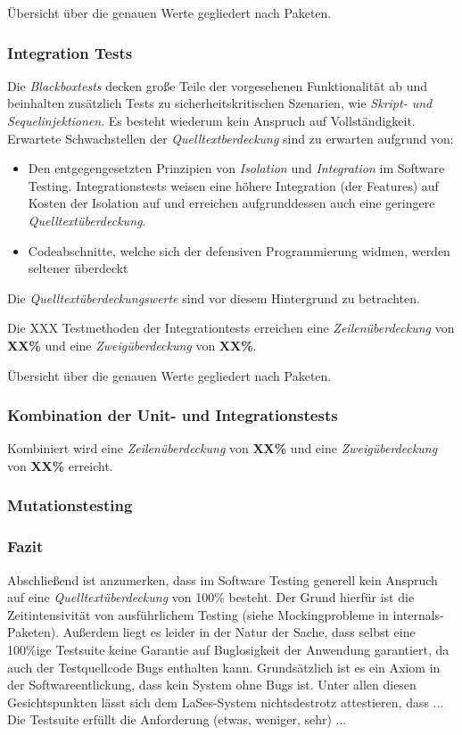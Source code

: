Übersicht über die genauen Werte gegliedert nach Paketen.


\subsubsection{Integration Tests}
Die \emph{Blackboxtests} decken große Teile der vorgesehenen Funktionalität ab und beinhalten zusätzlich Tests
zu sicherheitskritischen Szenarien, wie \emph{Skript- und Sequelinjektionen}.
Es besteht wiederum kein Anspruch auf Vollständigkeit.
Erwartete Schwachstellen der \emph{Quelltextberdeckung} sind zu erwarten aufgrund von:
\begin{itemize}
    \item Den entgegengesetzten Prinzipien von \emph{Isolation} und \emph{Integration} im Software Testing.
    Integrationstests weisen eine höhere Integration (der Features) auf Kosten der Isolation auf und
    erreichen aufgrunddessen auch eine geringere \emph{Quelltextüberdeckung}.
    \item Codeabschnitte, welche sich der defensiven Programmierung widmen, werden seltener überdeckt
\end{itemize}
Die \emph{Quelltextüberdeckungswerte} sind vor diesem Hintergrund zu betrachten.

Die XXX Testmethoden der Integrationtests erreichen eine \emph{Zeilenüberdeckung} von \textbf{XX\%}
und eine \emph{Zweigüberdeckung} von \textbf{XX\%}.

Übersicht über die genauen Werte gegliedert nach Paketen.


\subsubsection{Kombination der Unit- und Integrationstests}

Kombiniert wird eine
\emph{Zeilenüberdeckung} von \textbf{XX\%} und eine \emph{Zweigüberdeckung} von \textbf{XX\%} erreicht.

\subsubsection{Mutationstesting}

\subsubsection{Fazit}
Abschließend ist anzumerken, dass im Software Testing generell kein Anspruch auf eine \emph{Quelltextüberdeckung}
von 100\% besteht.
Der Grund hierfür ist die Zeitintensivität von ausführlichem Testing (siehe Mockingprobleme in internals-Paketen).
Außerdem liegt es leider in der Natur der Sache, dass selbst eine 100\%ige Testsuite keine Garantie auf Buglosigkeit
der Anwendung garantiert, da auch der Testquellcode Bugs enthalten kann.
Grundsätzlich ist es ein Axiom in der Softwareentlickung, dass kein System ohne Bugs ist.
Unter allen diesen Gesichtspunkten lässt sich dem LaSes-System nichtsdestrotz attestieren, dass ...
Die Testsuite erfüllt die Anforderung (etwas, weniger, sehr) ...